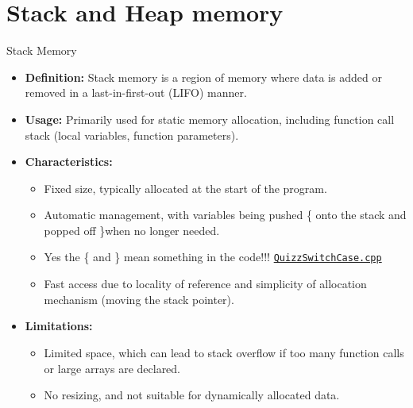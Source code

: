 \documentclass[10pt]{beamer}
\begin{document}
\section{Stack and Heap memory}
\begin{frame}{Stack Memory}
  \begin{itemize}
    \item \textbf{Definition:} Stack memory is a region of memory where data is added or removed in a last-in-first-out (LIFO) manner.
    \item \textbf{Usage:} Primarily used for static memory allocation, including function call stack (local variables, function parameters).
    \item \textbf{Characteristics:}
      \begin{itemize}
        \item Fixed size, typically allocated at the start of the program.
        \item Automatic management, with variables being pushed \{ onto the stack and popped off \}when no longer needed.
        \item Yes the \{ and \} mean something in the code!!! \href{run:./QuizzSwitchCase.cpp}{\texttt{QuizzSwitchCase.cpp}}
        \item Fast access due to locality of reference and simplicity of allocation mechanism (moving the stack pointer).
      \end{itemize}
    \item \textbf{Limitations:}
      \begin{itemize}
        \item Limited space, which can lead to stack overflow if too many function calls or large arrays are declared.
        \item No resizing, and not suitable for dynamically allocated data.
      \end{itemize}
  \end{itemize}
\end{frame}
\end{document}
